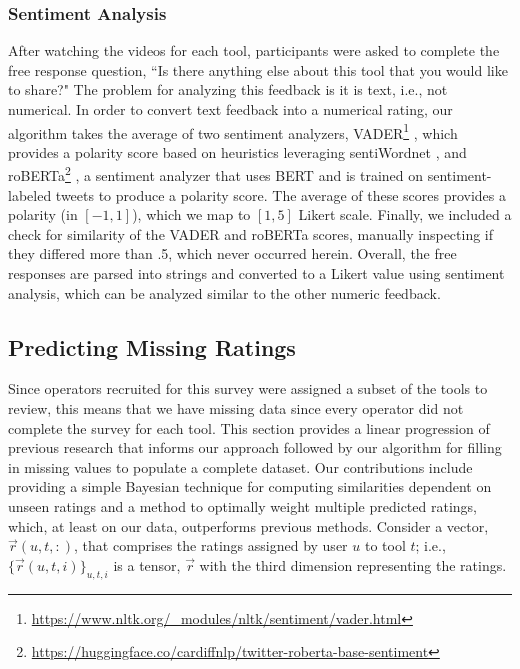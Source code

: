 \subsubsection{Sentiment Analysis}
After watching the videos for each tool, participants were asked to complete the free response question, ``Is there anything else about this tool that you would like to share?" 
The problem for analyzing this feedback is it is text, i.e., not numerical. 
In order to convert text feedback into a numerical rating, our algorithm takes the average of two sentiment analyzers, VADER\footnote{\url{https://www.nltk.org/_modules/nltk/sentiment/vader.html}} \cite{hutto2014vader}, which provides a polarity score based on heuristics leveraging sentiWordnet \cite{baccianella2010sentiwordnet}, and roBERTa\footnote{\url{https://huggingface.co/cardiffnlp/twitter-roberta-base-sentiment}} \cite{barbieri2020tweeteval}, a sentiment analyzer that uses BERT \cite{devlin2019bert} and is trained on sentiment-labeled tweets to produce a polarity score.
The average of these scores provides a polarity (in $[-1,1]$), which we map to $[1,5]$ Likert scale.
Finally, we included a check for similarity of the VADER and roBERTa scores, manually inspecting if they differed more than .5, which never occurred herein. 
Overall, the free responses are parsed into strings and converted to a Likert value using sentiment analysis, which can be analyzed similar to the other numeric feedback. 
\vspace{-2mm}
\subsection{Predicting Missing Ratings}
\vspace{-2mm}
Since operators recruited for this survey were assigned a subset of the tools to review, this means that we have missing data since every operator did not complete the survey for each tool. 
This section provides a linear progression of previous research that informs our approach followed by our algorithm for filling in missing values to populate a complete dataset. 
Our contributions include providing a simple Bayesian technique for computing similarities dependent on unseen ratings and a method to optimally weight multiple predicted ratings, which, at least on our data, outperforms previous methods. 
Consider a vector, $\vec{r}(u, t, :)$, that comprises the ratings assigned by user $u$ to tool $t$; i.e., $\{\vec{r}(u,t,i)\}_{u,t,i}$ is a tensor, $\vec{r}$ with the third dimension representing the ratings.


